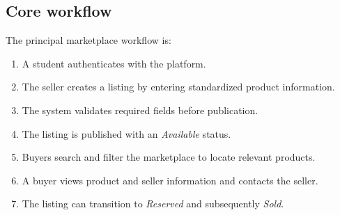 \documentclass[11pt,a4paper]{article}
\begin{document}
\subsection{Core workflow}

The principal marketplace workflow is:

\begin{enumerate}

    \item A student authenticates with the platform.

    \item The seller creates a listing by entering standardized
    product information.

    \item The system validates required fields before publication.

    \item The listing is published with an \textit{Available} status.

    \item Buyers search and filter the marketplace to locate relevant
    products.

    \item A buyer views product and seller information and contacts
    the seller.

    \item The listing can transition to \textit{Reserved} and
    subsequently \textit{Sold}.

\end{enumerate}

\end{document}
